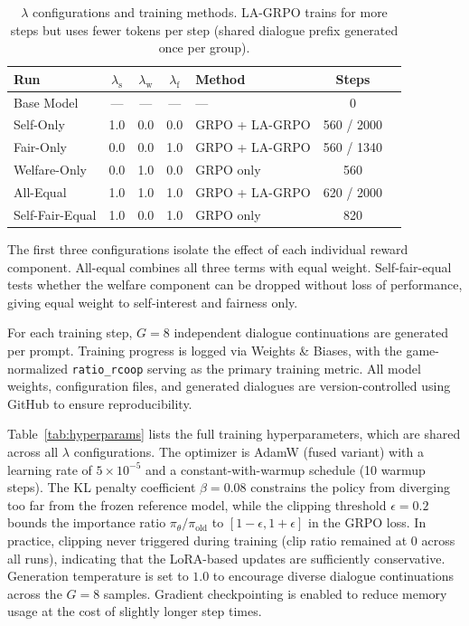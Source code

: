 \documentclass[12pt,a4paper]{article}
\begin{document}
\begin{table}[H]
\centering
\caption[$\lambda$ configurations and training methods.]{$\lambda$ configurations and training methods. LA-GRPO trains for more steps but uses fewer tokens per step (shared dialogue prefix generated once per group).}
\label{tab:lambda_configs}
\begin{tabular}{lccclcc}
\toprule
\textbf{Run} & $\lambda_{\text{s}}$ & $\lambda_{\text{w}}$ & $\lambda_{\text{f}}$ & \textbf{Method} & \textbf{Steps} \\
\midrule
Base Model & --- & --- & --- & --- & 0 \\
Self-Only & 1.0 & 0.0 & 0.0 & GRPO + LA-GRPO & 560 / 2000 \\
Fair-Only & 0.0 & 0.0 & 1.0 & GRPO + LA-GRPO & 560 / 1340 \\
Welfare-Only & 0.0 & 1.0 & 0.0 & GRPO only & 560 \\
All-Equal & 1.0 & 1.0 & 1.0 & GRPO + LA-GRPO & 620 / 2000 \\
Self-Fair-Equal & 1.0 & 0.0 & 1.0 & GRPO only & 820 \\
\bottomrule
\end{tabular}
\end{table}

The first three configurations isolate the effect of each individual reward component. All-equal combines all three terms with equal weight. Self-fair-equal tests whether the welfare component can be dropped without loss of performance, giving equal weight to self-interest and fairness only.

For each training step, $G = 8$ independent dialogue continuations are generated per prompt. Training progress is logged via Weights \& Biases, with the game-normalized \texttt{ratio\_rcoop} serving as the primary training metric. All model weights, configuration files, and generated dialogues are version-controlled using GitHub to ensure reproducibility.

Table~\ref{tab:hyperparams} lists the full training hyperparameters, which are shared across all $\lambda$ configurations. The optimizer is AdamW (fused variant) with a learning rate of $5 \times 10^{-5}$ and a constant-with-warmup schedule (10 warmup steps). The KL penalty coefficient $\beta = 0.08$ constrains the policy from diverging too far from the frozen reference model, while the clipping threshold $\epsilon = 0.2$ bounds the importance ratio $\pi_\theta / \pi_{\text{old}}$ to $[1 - \epsilon, 1 + \epsilon]$ in the GRPO loss. In practice, clipping never triggered during training (clip ratio remained at 0 across all runs), indicating that the LoRA-based updates are sufficiently conservative. Generation temperature is set to $1.0$ to encourage diverse dialogue continuations across the $G = 8$ samples. Gradient checkpointing is enabled to reduce memory usage at the cost of slightly longer step times.
\end{document}
